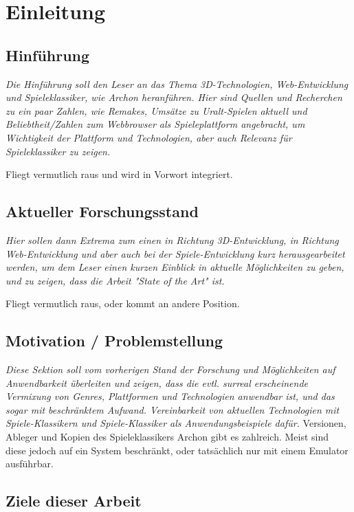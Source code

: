 \chapter{Einleitung}
\label{cha:Einleitung}

\section{Hinführung}
\label{sec:hinfuhrung}

\emph{Die Hinführung soll den Leser an das Thema 3D-Technologien, Web-Entwicklung und Spieleklassiker, wie Archon heranführen. Hier sind Quellen und Recherchen zu ein paar Zahlen, wie Remakes, Umsätze zu Uralt-Spielen aktuell und Beliebtheit/Zahlen zum Webbrowser als Spieleplattform angebracht, um Wichtigkeit der Plattform und Technologien, aber auch Relevanz für Spieleklassiker zu zeigen.}

Fliegt vermutlich raus und wird in Vorwort integriert.

\section{Aktueller Forschungsstand}
\label{sec:aktueller_forschungsstand}

\emph{Hier sollen dann Extrema zum einen in Richtung 3D-Entwicklung, in Richtung Web-Entwicklung und aber auch bei der Spiele-Entwicklung kurz herausgearbeitet werden, um dem Leser einen kurzen Einblick in aktuelle Möglichkeiten zu geben, und zu zeigen, dass die Arbeit "State of the Art" ist.}

Fliegt vermutlich raus, oder kommt an andere Position.

\section{Motivation / Problemstellung}
\label{sec:motivation}
\emph{ Diese Sektion soll vom vorherigen Stand der Forschung und Möglichkeiten auf Anwendbarkeit überleiten und zeigen, dass die evtl. surreal erscheinende Vermixung von Genres, Plattformen und Technologien anwendbar ist, und das sogar mit beschränktem Aufwand. Vereinbarkeit von aktuellen Technologien mit Spiele-Klassikern und Spiele-Klassiker als Anwendungsbeispiele dafür.}
Versionen, Ableger und Kopien des Spieleklassikers Archon gibt es zahlreich. Meist sind diese jedoch auf ein System beschränkt, oder tatsächlich nur mit einem Emulator ausführbar.
\section{Ziele dieser Arbeit}
\label{sec:ziele_dieser_arbeit}

